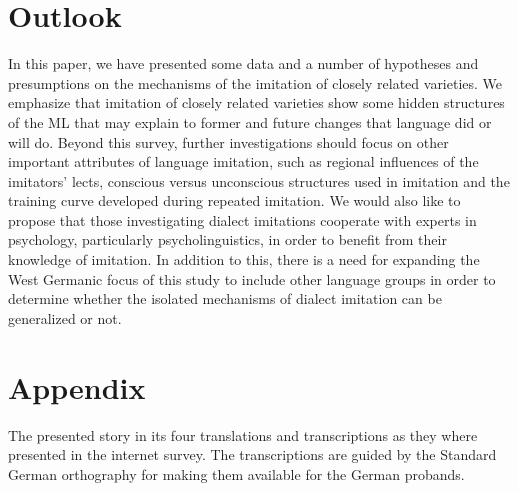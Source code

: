 \documentclass[output=paper]{LSP/langsci}
\begin{document}
  
 \section{Outlook}\label{outlook}

In this paper, we have presented some data and a number of hypotheses and presumptions on the mechanisms of the imitation of closely related varieties. We emphasize that imitation of closely related varieties  show some hidden structures of the ML that may explain to former and future changes that language did or will do.  Beyond this survey, further investigations should focus on other important attributes of language imitation, such as regional influences of the imitators’ lects, conscious versus unconscious structures used in imitation and the training curve developed during repeated imitation. We would also like to propose that those investigating dialect imitations cooperate with experts in psychology, particularly psycholinguistics, in order to benefit from their knowledge of imitation. In addition to this, there is a need for expanding the West Germanic focus of this study to include other language groups in order to determine whether the isolated mechanisms of dialect imitation can be generalized or not.

\section{Appendix}\label{appendix}

The presented story in its four translations and transcriptions as they where presented in the internet survey. The transcriptions are guided by the Standard German orthography for making them available for the German probands.\\
\end{document}
